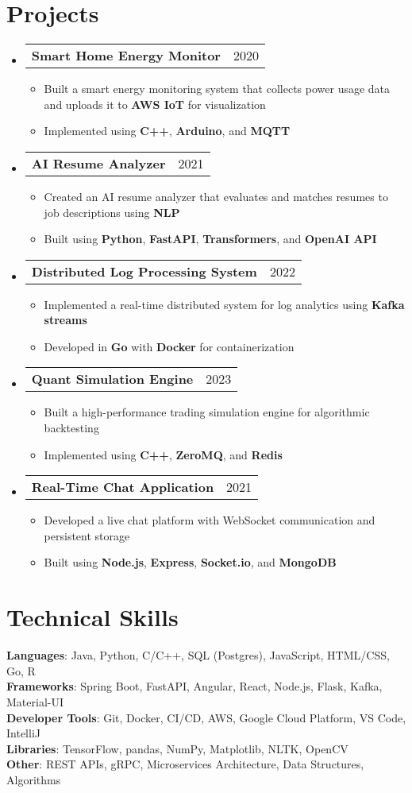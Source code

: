 \documentclass[letterpaper,11pt]{article}
\makeatletter
\newcommand{\resumeItem}[1]{
    \item\small{
            {#1 \vspace{-2pt}}
    }
}
\newcommand{\resumeProjectHeading}[2]{
    \item
    \begin{tabular*}{0.97\textwidth}{l@{\extracolsep{\fill}}r}
    \small#1 & #2 \\
    \end{tabular*}\vspace{-7pt}
}
\newcommand{\resumeSubHeadingListStart}{\begin{itemize}[leftmargin=0.15in, label={}]}
\newcommand{\resumeSubHeadingListEnd}{\end{itemize}}
\newcommand{\resumeItemListStart}{\begin{itemize}}
\newcommand{\resumeItemListEnd}{\end{itemize}\vspace{-5pt}}
\makeatother
\begin{document}
\section{Projects}
\resumeSubHeadingListStart
\resumeProjectHeading
{\textbf{Smart Home Energy Monitor}}{2020}
\resumeItemListStart
\resumeItem{Built a smart energy monitoring system that collects power usage data and uploads it to \textbf{AWS IoT} for visualization}
\resumeItem{Implemented using \textbf{C++}, \textbf{Arduino}, and \textbf{MQTT}}
\resumeItemListEnd
\resumeProjectHeading
{\textbf{AI Resume Analyzer}}{2021}
\resumeItemListStart
\resumeItem{Created an AI resume analyzer that evaluates and matches resumes to job descriptions using \textbf{NLP}}
\resumeItem{Built using \textbf{Python}, \textbf{FastAPI}, \textbf{Transformers}, and \textbf{OpenAI API}}
\resumeItemListEnd
\resumeProjectHeading
{\textbf{Distributed Log Processing System}}{2022}
\resumeItemListStart
\resumeItem{Implemented a real-time distributed system for log analytics using \textbf{Kafka streams}}
\resumeItem{Developed in \textbf{Go} with \textbf{Docker} for containerization}
\resumeItemListEnd
\resumeProjectHeading
{\textbf{Quant Simulation Engine}}{2023}
\resumeItemListStart
\resumeItem{Built a high-performance trading simulation engine for algorithmic backtesting}
\resumeItem{Implemented using \textbf{C++}, \textbf{ZeroMQ}, and \textbf{Redis}}
\resumeItemListEnd
\resumeProjectHeading
{\textbf{Real-Time Chat Application}}{2021}
\resumeItemListStart
\resumeItem{Developed a live chat platform with WebSocket communication and persistent storage}
\resumeItem{Built using \textbf{Node.js}, \textbf{Express}, \textbf{Socket.io}, and \textbf{MongoDB}}
\resumeItemListEnd
\resumeSubHeadingListEnd

\section{Technical Skills}
\begin{itemize}[leftmargin=0.15in, label={}]
\small{\item{
\textbf{Languages}{: Java, Python, C/C++, SQL (Postgres), JavaScript, HTML/CSS, Go, R} \\
\textbf{Frameworks}{: Spring Boot, FastAPI, Angular, React, Node.js, Flask, Kafka, Material-UI} \\
\textbf{Developer Tools}{: Git, Docker, CI/CD, AWS, Google Cloud Platform, VS Code, IntelliJ} \\
\textbf{Libraries}{: TensorFlow, pandas, NumPy, Matplotlib, NLTK, OpenCV} \\
\textbf{Other}{: REST APIs, gRPC, Microservices Architecture, Data Structures, Algorithms} \\
}}
\end{itemize}
\end{document}
